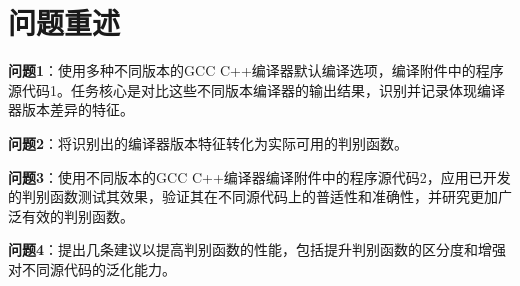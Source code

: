 \section{问题重述}
\textbf{问题1}：使用多种不同版本的GCC C++编译器默认编译选项，编译附件中的程序源代码1。任务核心是对比这些不同版本编译器的输出结果，识别并记录体现编译器版本差异的特征。

\textbf{问题2}：将识别出的编译器版本特征转化为实际可用的判别函数。

\textbf{问题3}：使用不同版本的GCC C++编译器编译附件中的程序源代码2，应用已开发的判别函数测试其效果，验证其在不同源代码上的普适性和准确性，并研究更加广泛有效的判别函数。

\textbf{问题4}：提出几条建议以提高判别函数的性能，包括提升判别函数的区分度和增强对不同源代码的泛化能力。

